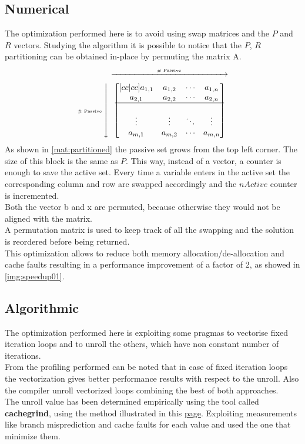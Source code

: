\subsection{Numerical}
The optimization performed here is to avoid using swap matrices and the $P$ and $R$ vectors. Studying the algorithm it is possible to notice that the $P$, $R$ partitioning can be obtained in-place by permuting the matrix A.
\begin{equation}
  \label{mat:partitioned}
  \text{\tiny \# Passive}\mymatrix{\begin{bmatrix}[cc|cc]
    a_{1,1} & a_{1,2} & \cdots & a_{1,n} \\
    a_{2,1} & a_{2,2} & \cdots & a_{2,n} \\
    \hline \\
    \vdots  & \vdots  & \ddots & \vdots  \\
    a_{m,1} & a_{m,2} & \cdots & a_{m,n}
  \end{bmatrix}}
\end{equation}
As shown in \ref{mat:partitioned} the passive set grows from the top left corner. The size of this block is the same as $P$. This way, instead of a vector, a counter is enough to save the active set. Every time a variable enters in the active set the corresponding column and row are swapped accordingly and the $nActive$ counter is incremented. \\
Both the vector b and x are permuted, because otherwise they would not be aligned with the matrix. \\
A permutation matrix is used to keep track of all the swapping and the solution is reordered before being returned. \\
This optimization allows to reduce both memory allocation/de-allocation and cache faults resulting in a performance improvement of a factor of 2, as showed in \ref{img:speedup01}.
\subsection{Algorithmic}
The optimization performed here is exploiting some pragmas to vectorise fixed iteration loops and to unroll the others, which have non constant number  of iterations. \\
From the profiling performed can be noted that in case of fixed iteration loops the vectorization gives better performance results with respect to the unroll. Also the compiler unroll vectorized loops combining the best of both approaches. \\
The unroll value has been determined empirically using the tool called \textbf{cachegrind}, using the method illustrated in this \href{http://valgrind.org/docs/manual/cg-manual.html}{page}. Exploiting measurements like branch misprediction and cache faults for each value and used the one that minimize them.\\